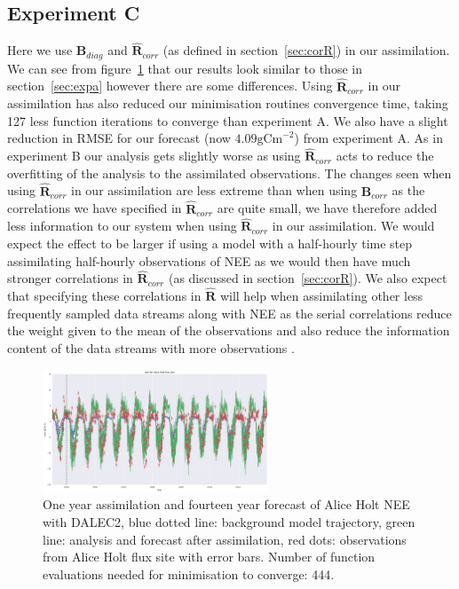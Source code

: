 \documentclass[11pt]{article}
\begin{document}
\subsection{Experiment C} \label{sec:expc}

Here we use $\textbf{B}_{diag}$ and $\hat{\textbf{R}}_{corr}$ (as defined in section~\ref{sec:corR}) in our assimilation. We can see from figure~\ref{fig:4dvardiagBcorR} that our results look similar to those in section~\ref{sec:expa} however there are some differences. Using $\hat{\textbf{R}}_{corr}$ in our assimilation has also reduced our minimisation routines convergence time, taking 127 less function iterations to converge than experiment A. We also have a slight reduction in RMSE for our forecast (now $4.09 \text{gCm}^{-2}$) from experiment A. As in experiment B our analysis gets slightly worse as using $\hat{\textbf{R}}_{corr}$ acts to reduce the overfitting of the analysis to the assimilated observations. The changes seen when using $\hat{\textbf{R}}_{corr}$ in our assimilation are less extreme than when using $\textbf{B}_{corr}$ as the correlations we have specified in $\hat{\textbf{R}}_{corr}$ are quite small, we have therefore added less information to our system when using $\hat{\textbf{R}}_{corr}$ in our assimilation. We would expect the effect to be larger if using a model with a half-hourly time step assimilating half-hourly observations of NEE as we would then have much stronger correlations in $\hat{\textbf{R}}_{corr}$ (as discussed in section~\ref{sec:corR}). We also expect that specifying these correlations in  $\hat{\textbf{R}}$ will help when assimilating other less frequently sampled data streams along with NEE as the serial correlations reduce the weight given to the mean of the observations and also reduce the information content of the data streams with more observations \citep{jarvinen1999variational, Daley1992}.

\begin{figure}[ht]
    \centering
    \includegraphics[width=0.6\textwidth]{bdiagr_corr_cor03_tau4_cutoff4_var05_4dvar.png}
    \caption{One year assimilation and fourteen year forecast of Alice Holt NEE with DALEC2, blue dotted line: background model trajectory, green line: analysis and forecast after assimilation, red dots: observations from Alice Holt flux site with error bars. Number of function evaluations needed for minimisation to converge: 444.}
    \label{fig:4dvardiagBcorR}
\end{figure}
\end{document}
